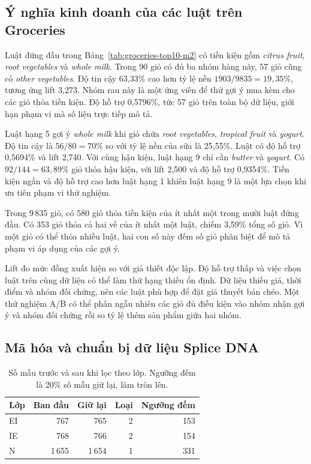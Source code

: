 \subsection{Ý nghĩa kinh doanh của các luật trên Groceries}
Luật đứng đầu trong Bảng~\ref{tab:groceries-top10-m2} có tiền kiện
gồm \emph{citrus fruit}, \emph{root vegetables} và \emph{whole milk}.
Trong 90 giỏ có đủ ba nhóm hàng này, 57 giỏ cũng có \emph{other
vegetables}. Độ tin cậy 63,33\% cao hơn tỷ lệ nền
$1903/9835=19{,}35\%$, tương ứng lift 3,273. Nhóm rau này là một
ứng viên để thử gợi ý mua kèm cho các giỏ thỏa tiền kiện. Độ hỗ
trợ 0,5796\%, tức 57 giỏ trên toàn bộ dữ liệu, giới hạn phạm vi
mà số liệu trực tiếp mô tả.

Luật hạng 5 gợi ý \emph{whole milk} khi giỏ chứa \emph{root
vegetables}, \emph{tropical fruit} và \emph{yogurt}. Độ tin cậy
là $56/80=70\%$ so với tỷ lệ nền của sữa là 25,55\%. Luật có độ
hỗ trợ 0,5694\% và lift 2,740. Với cùng hậu kiện, luật hạng 9
chỉ cần \emph{butter} và \emph{yogurt}. Có $92/144=63{,}89\%$
giỏ thỏa hậu kiện, với lift 2,500 và độ hỗ trợ 0,9354\%.
Tiền kiện ngắn và độ hỗ trợ cao hơn luật hạng 1 khiến luật
hạng 9 là một lựa chọn khi ưu tiên phạm vi thử nghiệm.

Trong 9\,835 giỏ, có 580 giỏ thỏa tiền kiện của ít nhất một
trong mười luật đứng đầu. Có 353 giỏ thỏa cả hai vế của ít nhất
một luật, chiếm 3,59\% tổng số giỏ. Vì một giỏ có thể thỏa nhiều
luật, hai con số này đếm số giỏ phân biệt để mô tả phạm vi áp
dụng của các gợi ý.

Lift đo mức đồng xuất hiện so với giả thiết độc lập. Độ hỗ trợ
thấp và việc chọn luật trên cùng dữ liệu có thể làm thứ hạng
thiếu ổn định. Dữ liệu thiếu giá, thời điểm và nhóm đối chứng,
nên các luật phù hợp để đặt giả thuyết bán chéo. Một thử nghiệm
A/B có thể phân ngẫu nhiên các giỏ đủ điều kiện vào nhóm nhận
gợi ý và nhóm đối chứng rồi so tỷ lệ thêm sản phẩm giữa hai nhóm.

\subsection{Mã hóa và chuẩn bị dữ liệu Splice DNA}
\begin{table}[!tb]
\centering
\caption{Số mẫu trước và sau khi lọc theo lớp. Ngưỡng đếm là 20\% số mẫu giữ lại, làm tròn lên.}
\label{tab:splice-preparation-b}
\begin{tabular}{lrrrr}
\toprule
Lớp & Ban đầu & Giữ lại & Loại & Ngưỡng đếm \\
\midrule
EI & 767 & 765 & 2 & 153 \\
IE & 768 & 766 & 2 & 154 \\
N & 1\,655 & 1\,654 & 1 & 331 \\
\bottomrule
\end{tabular}
\end{table}

